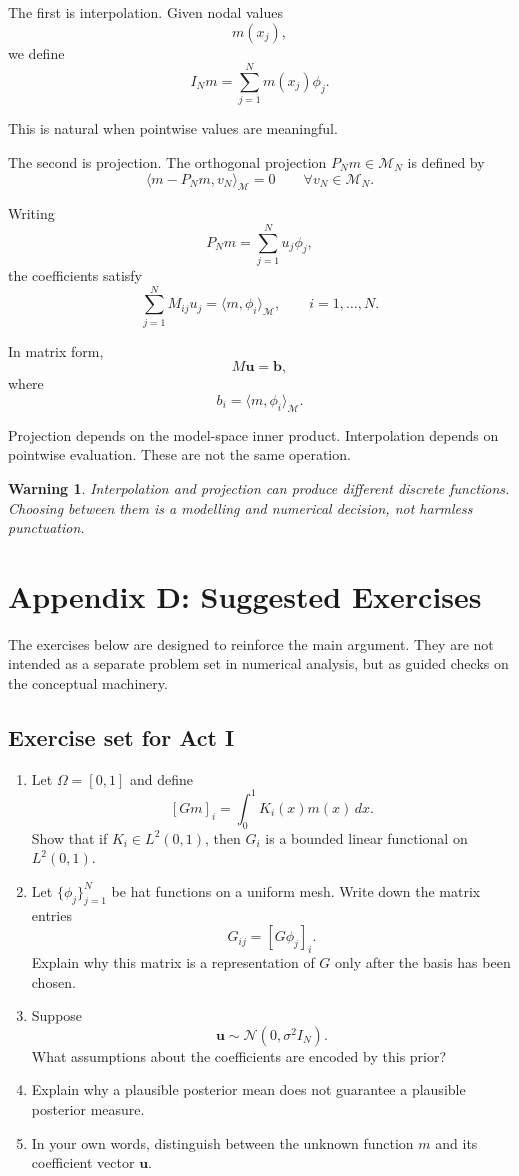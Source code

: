 \documentclass[11pt,a4paper]{book}
\newtheorem{warning}[definition]{Warning}
\newcommand{\M}{\mathcal{M}}      %
\newcommand{\G}{G}
\begin{document}
The first is interpolation. Given nodal values
\[
    m(x_j),
\]
we define
\[
    I_Nm
    =
    \sum_{j=1}^N m(x_j)\phi_j.
\]

This is natural when pointwise values are meaningful.

The second is projection. The orthogonal projection $P_Nm\in\M_N$ is defined by
\[
    \langle m-P_Nm,v_N\rangle_{\M}=0
    \qquad
    \forall v_N\in\M_N.
\]

Writing
\[
    P_Nm=\sum_{j=1}^N u_j\phi_j,
\]
the coefficients satisfy
\[
    \sum_{j=1}^N
    M_{ij}u_j
    =
    \langle m,\phi_i\rangle_{\M},
    \qquad
    i=1,\ldots,N.
\]

In matrix form,
\[
    M\bm{u}=\bm{b},
\]
where
\[
    b_i=\langle m,\phi_i\rangle_{\M}.
\]

Projection depends on the model-space inner product. Interpolation depends on
pointwise evaluation. These are not the same operation.

\begin{warning}
Interpolation and projection can produce different discrete functions. Choosing
between them is a modelling and numerical decision, not harmless punctuation.
\end{warning}

\chapter{Appendix D: Suggested Exercises}

The exercises below are designed to reinforce the main argument. They are not
intended as a separate problem set in numerical analysis, but as guided checks
on the conceptual machinery.

\section{Exercise set for Act I}

\begin{enumerate}[label=\textbf{I.\arabic*.}]
    \item Let $\Omega=[0,1]$ and define
    \[
        [\G m]_i
        =
        \int_0^1 K_i(x)m(x)\,dx.
    \]
    Show that if $K_i\in L^2(0,1)$, then $\G_i$ is a bounded linear functional
    on $L^2(0,1)$.

    \item Let $\{\phi_j\}_{j=1}^N$ be hat functions on a uniform mesh. Write
    down the matrix entries
    \[
        G_{ij}=[\G\phi_j]_i.
    \]
    Explain why this matrix is a representation of $\G$ only after the basis
    has been chosen.

    \item Suppose
    \[
        \bm{u}\sim\mathcal{N}(0,\sigma^2 I_N).
    \]
    What assumptions about the coefficients are encoded by this prior?

    \item Explain why a plausible posterior mean does not guarantee a
    plausible posterior measure.

    \item In your own words, distinguish between the unknown function $m$ and
    its coefficient vector $\bm{u}$.
\end{enumerate}
\end{document}
